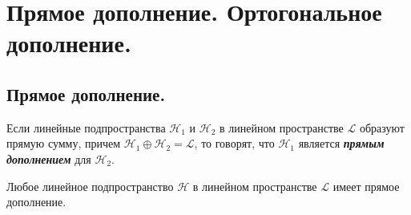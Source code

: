 \section{
    Прямое дополнение. Ортогональное дополнение.
}

\subsection{
    Прямое дополнение.
}

\begin{definition}
    Если линейные подпространства $\mathcal{H}_1$ и $\mathcal{H}_2$ в линейном пространстве $\mathcal{L}$ образуют прямую сумму, причем $\mathcal{H}_1 \oplus \mathcal{H}_2 = \mathcal{L}$, то говорят, что $\mathcal{H}_1$ является \textit{\textbf{прямым дополнением}} для $\mathcal{H}_2$.
\end{definition}

\begin{theorem}
    Любое линейное подпространство $\mathcal{H}$ в линейном пространстве $\mathcal{L}$ имеет прямое дополнение.
\end{theorem}

